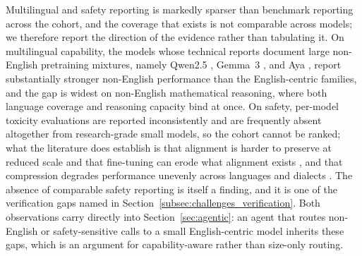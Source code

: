 Multilingual and safety reporting is markedly sparser than benchmark reporting
across the cohort, and the coverage that exists is not comparable across models;
we therefore report the direction of the evidence rather than tabulating it.
On multilingual capability, the models whose technical reports document
large non-English pretraining mixtures, namely Qwen2.5 \citep{qwen2024qwen25}, Gemma~3
\citep{team2025gemma3}, and Aya \citep{ustun2024aya}, report substantially
stronger non-English performance than the English-centric families, and the gap
is widest on non-English mathematical reasoning, where both language coverage and
reasoning capacity bind at once. On safety, per-model toxicity evaluations are
reported inconsistently and are frequently absent altogether from research-grade
small models, so the cohort cannot be ranked; what the literature does establish
is that alignment is harder to preserve at reduced scale and that fine-tuning can
erode what alignment exists \citep{qi2023finetuning}, and that compression
degrades performance unevenly across languages and dialects
\citep{blodgett2020language,kurz2025pruning_vs_quant}. The absence of
comparable safety reporting is itself a finding, and it is one of the
verification gaps named in Section~\ref{subsec:challenges_verification}.
Both observations carry directly into
Section~\ref{sec:agentic}: an agent that routes non-English or safety-sensitive
calls to a small English-centric model inherits these gaps, which is an argument
for capability-aware rather than size-only routing.
